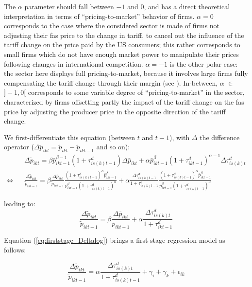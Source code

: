 \documentclass[a4paper,11pt]{article}
\begin{document}
The $\alpha$ parameter should fall between $-1$ and $0$, and has a direct theoretical interpretation in terms of ``pricing-to-market'' behavior of firms. $\alpha = 0$ corresponds to the case where the considered sector is made of firms not adjusting their fas price to the change in tariff, to cancel out the influence of the tariff change on the price paid by the US consumers; this rather corresponds to small firms which do not have enough market power to manipulate their prices following changes in international competition. $\alpha = -1$ is the other polar case: the sector here displays full pricing-to-market, because it involves large firms fully compensating the tariff change through their margin (see \citealp{Berman_Martin_Mayer_2012}).
In-between, $\alpha$ $\in$ $]-1,0[$ corresponds to some variable degree of ``pricing-to-market'' in the sector, characterized by firms offsetting partly the impact of the tariff change on the fas price by adjusting the producer price in the opposite direction of the tariff change.

We first-differentiate this equation (between $t$ and $t-1$), with $\Delta $ the difference operator ($\Delta\widetilde{p}_{ikt} = \widetilde{p}_{ikt} - \widetilde{p}_{ikt-1}$ and so on):
\begin{eqnarray*}
&&\Delta \widetilde{p}_{ikt} = \beta \bar{p}_{ikt-1}^{\beta-1}(1+\tau^d_{is(k)t-1})\Delta \bar{p}_{ikt} + \alpha \bar{p}^\beta_{ikt-1} (1+\tau^d_{ikt-1})^{\alpha-1}\Delta \tau^d_{is(k)t}  \\
\Leftrightarrow &&\frac{\Delta \widetilde{p}_{ikt}}{\widetilde{p}_{ikt-1}} = \beta \frac{\Delta \bar{p}_{ikt}}{\widetilde{p}_{ikt-1}} \frac{(1+\tau^d_{is(k)t-1})^\alpha \bar{p}_{ikt-1}^\beta}{\bar{p}^\beta_{ikt-1}(1+\tau^d_{is(k)t-1})^\alpha} +\alpha \frac{\Delta \tau^d_{is(k)t-1}}{1+\tau_{is(k)t-1}^d}\frac{(1+\tau^d_{is(k)t-1})^\alpha \bar{p}_{ikt-1}^\beta}{\bar{p}^\beta_{ikt-1}(1+\tau^d_{is(k)t-1})^\alpha} \end{eqnarray*}

leading to:
\begin{equation}
\frac{\Delta \widetilde{p}_{ikt}}{\widetilde{p}_{ikt-1}} =  \beta \frac{\Delta \bar{p}_{ikt}}{\bar{p}_{ikt-1}} +\alpha\frac{\Delta \tau^d_{is(k)t}}{1+\tau_{ikt-1}^d} \label{eq:firststage_Deltalog}
\end{equation}

Equation (\ref{eq:firststage_Deltalog}) brings a first-stage regression model as follows:

$$\frac{\Delta \widetilde{p}_{ikt}}{\widetilde{p}_{ikt-1}} = \alpha \frac{\Delta \tau^d_{is(k)t}}{1+\tau_{is(k)t-1}^d} + \gamma_{i} +\gamma_{k}+\epsilon_{ik}$$
\end{document}
